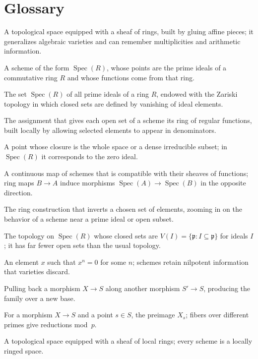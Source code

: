 \section*{Glossary}
\begin{description}[leftmargin=*,style=nextline,itemsep=0.3em]
\item[\textbf{Scheme.}] A topological space equipped with a sheaf of rings, built by gluing affine pieces; it generalizes algebraic varieties and can remember multiplicities and arithmetic information.
\item[\textbf{Affine scheme.}] A scheme of the form $\operatorname{Spec}(R)$, whose points are the prime ideals of a commutative ring $R$ and whose functions come from that ring.
\item[\textbf{Prime spectrum.}] The set $\operatorname{Spec}(R)$ of all prime ideals of a ring $R$, endowed with the Zariski topology in which closed sets are defined by vanishing of ideal elements.
\item[\textbf{Structure sheaf.}] The assignment that gives each open set of a scheme its ring of regular functions, built locally by allowing selected elements to appear in denominators.
\item[\textbf{Generic point.}] A point whose closure is the whole space or a dense irreducible subset; in $\operatorname{Spec}(R)$ it corresponds to the zero ideal.
\item[\textbf{Morphism.}] A continuous map of schemes that is compatible with their sheaves of functions; ring maps $B\to A$ induce morphisms $\operatorname{Spec}(A)\to\operatorname{Spec}(B)$ in the opposite direction.
\item[\textbf{Localization.}] The ring construction that inverts a chosen set of elements, zooming in on the behavior of a scheme near a prime ideal or open subset.
\item[\textbf{Zariski topology.}] The topology on $\operatorname{Spec}(R)$ whose closed sets are $V(I)=\{\mathfrak{p}:I\subseteq\mathfrak{p}\}$ for ideals $I$; it has far fewer open sets than the usual topology.
\item[\textbf{Nilpotent.}] An element $x$ such that $x^n=0$ for some $n$; schemes retain nilpotent information that varieties discard.
\item[\textbf{Base change.}] Pulling back a morphism $X\to S$ along another morphism $S'\to S$, producing the family over a new base.
\item[\textbf{Fiber.}] For a morphism $X\to S$ and a point $s\in S$, the preimage $X_s$; fibers over different primes give reductions mod~$p$.
\item[\textbf{Locally ringed space.}] A topological space equipped with a sheaf of local rings; every scheme is a locally ringed space.
\end{description}
